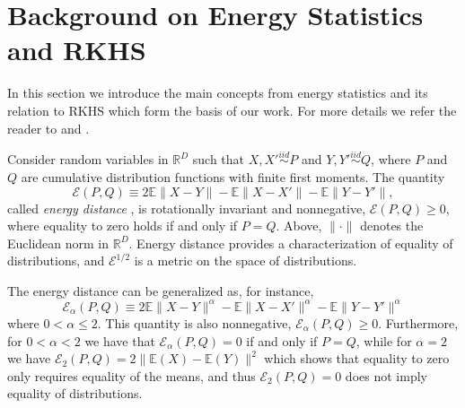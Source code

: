 \documentclass[aps,preprint,nofootinbib,floatfix]{revtex4-1}
\newcommand\Energy{\mathcal{E}}
\newcommand\E{\mathbb{E}}
\begin{document}
\section{Background on Energy Statistics and RKHS}
\label{sec:background}



In this section we introduce the main concepts from energy
statistics and its relation to 
RKHS which form the basis of our work.
For more details we refer the reader
to \cite{Szkely2013} and \cite{Sejdinovic2013}.

Consider random variables in $\mathbb{R}^D$ 
such that $X,X' \stackrel{iid}{\sim} P$ and 
$Y,Y' \stackrel{iid}{\sim} Q$, where $P$ and $Q$ are cumulative
distribution functions with finite first moments. 
The quantity 
\begin{equation}
\label{eq:energy}
\Energy(P, Q) \equiv 2 \E \| X - Y\| - \E \| X - X' \| - \E \| Y - Y' \|,
\end{equation}
called \emph{energy distance} \cite{Szkely2013}, 
is rotationally invariant and nonnegative, $\Energy(P,Q) \ge 0$, where
equality
to zero holds if and only if $P = Q$.
Above, $\| \cdot \|$ denotes the
Euclidean norm in $\mathbb{R}^D$. 
Energy distance
provides a characterization of equality of distributions, and
$\Energy^{1/2}$ is
a metric on the space of distributions.

The energy distance can be generalized as, for instance,
\begin{equation}
\label{eq:energy2}
\Energy_\alpha(P, Q) \equiv 
2 \E \| X - Y\|^{\alpha} - \E \| X - X' \|^{\alpha} - 
\E \| Y - Y' \|^{\alpha}
\end{equation}
where $0<\alpha\le 2$. This quantity is also nonnegative,
$\Energy_\alpha(P,Q) \ge 0$. Furthermore, for $0<\alpha<2$ we have that
$\Energy_\alpha(P,Q) = 0$ if and only if $P=Q$, while for $\alpha=2$ 
we have $\Energy_2(P,Q) = 2\| \E(X) - \E(Y) \|^2$ which shows that
equality to zero only requires
equality of the means, and thus $\Energy_2(P,Q)=0$ does 
not imply equality of distributions.
\end{document}
